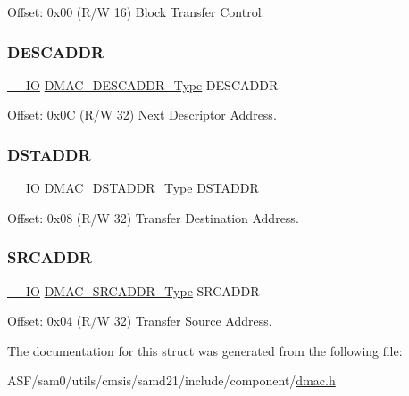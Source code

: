 Offset\+: 0x00 (R/W 16) Block Transfer Control. 

\mbox{\label{struct_dmac_descriptor_a1c8d3adfe0bd45b3f49ed6b3bc884674}} 
\subsubsection{\texorpdfstring{DESCADDR}{DESCADDR}}
{\footnotesize\ttfamily \mbox{\hyperlink{core__cm0plus_8h_aec43007d9998a0a0e01faede4133d6be}{\+\_\+\+\_\+\+IO}} \mbox{\hyperlink{union_d_m_a_c___d_e_s_c_a_d_d_r___type}{D\+M\+A\+C\+\_\+\+D\+E\+S\+C\+A\+D\+D\+R\+\_\+\+Type}} D\+E\+S\+C\+A\+D\+DR}



Offset\+: 0x0C (R/W 32) Next Descriptor Address. 

\mbox{\label{struct_dmac_descriptor_af2289e9979f4beae2ca64fde972762b9}} 
\subsubsection{\texorpdfstring{DSTADDR}{DSTADDR}}
{\footnotesize\ttfamily \mbox{\hyperlink{core__cm0plus_8h_aec43007d9998a0a0e01faede4133d6be}{\+\_\+\+\_\+\+IO}} \mbox{\hyperlink{union_d_m_a_c___d_s_t_a_d_d_r___type}{D\+M\+A\+C\+\_\+\+D\+S\+T\+A\+D\+D\+R\+\_\+\+Type}} D\+S\+T\+A\+D\+DR}



Offset\+: 0x08 (R/W 32) Transfer Destination Address. 

\mbox{\label{struct_dmac_descriptor_a9e61b7d0eff969d967dfca4eaf65ece3}} 
\subsubsection{\texorpdfstring{SRCADDR}{SRCADDR}}
{\footnotesize\ttfamily \mbox{\hyperlink{core__cm0plus_8h_aec43007d9998a0a0e01faede4133d6be}{\+\_\+\+\_\+\+IO}} \mbox{\hyperlink{union_d_m_a_c___s_r_c_a_d_d_r___type}{D\+M\+A\+C\+\_\+\+S\+R\+C\+A\+D\+D\+R\+\_\+\+Type}} S\+R\+C\+A\+D\+DR}



Offset\+: 0x04 (R/W 32) Transfer Source Address. 



The documentation for this struct was generated from the following file\+:\begin{DoxyCompactItemize}
\item 
A\+S\+F/sam0/utils/cmsis/samd21/include/component/\mbox{\hyperlink{component_2dmac_8h}{dmac.\+h}}\end{DoxyCompactItemize}
